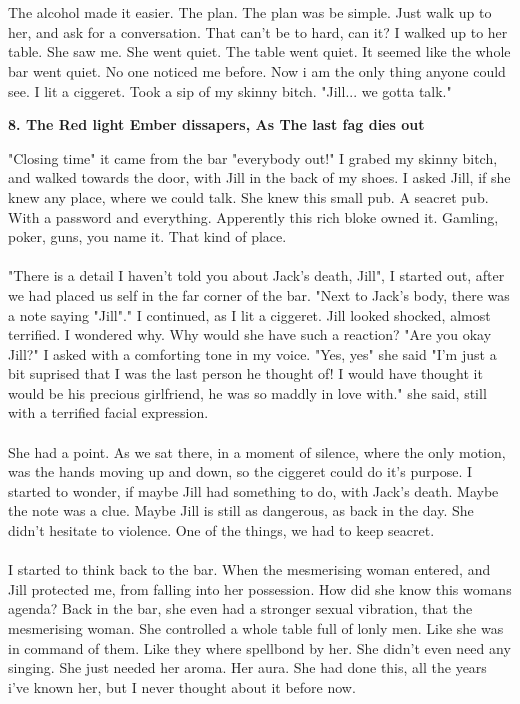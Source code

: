 \documentclass[]{article}
\begin{document}
\\ \\
The alcohol made it easier. The plan. The plan was be simple. Just walk up to her, and ask for a conversation. That can't be to hard, can it? I walked up to her table. She saw me. She went quiet. The table went quiet. It seemed like the whole bar went quiet. No one noticed me before. Now i am the only thing anyone could see. I lit a ciggeret. Took a sip of my skinny bitch. "Jill... we gotta talk."

\newpage

\begin{center}
	\large\textbf{8. The Red light Ember dissapers, \newline As The last fag dies out}
\end{center}

"Closing time" it came from the bar "everybody out!" I grabed my skinny bitch, and walked towards the door, with Jill in the back of my shoes. I asked Jill, if she knew any place, where we could talk. She knew this small pub. A seacret pub. With a password and everything. Apperently this rich bloke owned it. Gamling, poker, guns, you name it. That kind of place. 
\\ \\
"There is a detail I haven't told you about Jack's death, Jill", I started out, after we had placed us self in the far corner of the bar. "Next to Jack's body, there was a note saying "Jill"." I continued, as I lit a ciggeret. Jill looked shocked, almost terrified. I wondered why. Why would she have such a reaction? "Are you okay Jill?" I asked with a comforting tone in my voice. "Yes, yes" she said "I'm just a bit suprised that I was the last person he thought of! I would have thought it would be his precious girlfriend, he was so maddly in love with." she said, still with a terrified facial expression.
\\ \\
She had a point. As we sat there, in a moment of silence, where the only motion, was the hands moving up and down, so the ciggeret could do it's purpose. I started to wonder, if maybe Jill had something to do, with Jack's death. Maybe the note was a clue. Maybe Jill is still as dangerous, as back in the day. She didn't hesitate to violence. One of the things, we had to keep seacret.
\\ \\
I started to think back to the bar. When the mesmerising woman entered, and Jill protected me, from falling into her possession. How did she know this womans agenda? Back in the bar, she even had a stronger sexual vibration, that the mesmerising woman. She controlled a whole table full of lonly men. Like she was in command of them. Like they where spellbond by her. She didn't even need any singing. She just needed her aroma. Her aura. She had done this, all the years i've known her, but I never thought about it before now.
\end{document}
